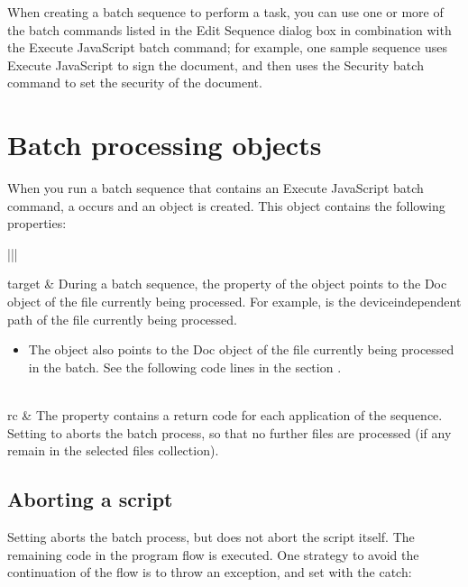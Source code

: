 \documentclass[letterpaper,12pt,english,openany,oneside]{sphinxmanual}
\begin{document}
When creating a batch sequence to perform a task, you can use one or more of the batch commands listed in the Edit Sequence dialog box in combination with the Execute JavaScript batch command; for example, one sample sequence uses Execute JavaScript to sign the document, and then uses the Security batch command to set the security of the document.


\section{Batch processing objects}
\label{\detokenize{index:batch-processing-objects}}
When you run a batch sequence that contains an Execute JavaScript batch command, a  occurs and an  object is created. This object contains the following properties:


\begin{savenotes}\sphinxattablestart
\centering
\begin{tabular}[t]{|*{2}{|}}
\hline

target
&
During a batch sequence, the  property of the  object points to the Doc object of the file currently being processed. For example,  is the device\sphinxhyphen{}independent path of the file currently being processed.
\begin{itemize}
\item {} 
The  object also points to the Doc object of the file currently being processed in the batch. See the following code lines in the section .

\end{itemize}
\\
\hline
rc
&
The  property contains a return code for each application of the sequence. Setting  to  aborts the batch process, so that no further files are processed (if any remain in the selected files collection).
\\
\hline
\end{tabular}
\par
\sphinxattableend\end{savenotes}


\subsection{Aborting a script}
\label{\detokenize{index:aborting-a-script}}
Setting  \sphinxcode{\sphinxupquote{=}}  aborts the batch process, but does not abort the script itself. The remaining code in the program flow is executed. One strategy to avoid the continuation of the flow is to throw an exception, and set  \sphinxcode{\sphinxupquote{=}}  with the catch:
\end{document}
